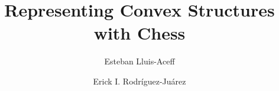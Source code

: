 
\title{Representing Convex Structures with Chess}

\usepackage{amsmath}
\usepackage{amsfonts}
\usepackage{amssymb}
\usepackage{mathrsfs}
\usepackage{graphicx}

\author{Esteban Lluis-Aceff}
\address{CDMX. Mexico}

\author{Erick I. Rodríguez-Juárez}
\address{CDMX. Mexico}

\newtheorem{theorem}{Theorem}[section]
\newtheorem{prop}[theorem]{Proposition}
\newtheorem{lemma}[theorem]{Lemma}
\newtheorem{coro}[theorem]{Corollary}

\theoremstyle{definition}
\newtheorem{definition}[theorem]{Definition}
\newtheorem{example}[theorem]{Example}
\newtheorem{xca}[theorem]{Exercise}

\theoremstyle{remark}
\newtheorem{remark}[theorem]{Remark}


\newcommand{\dis}{\displaystyle}
